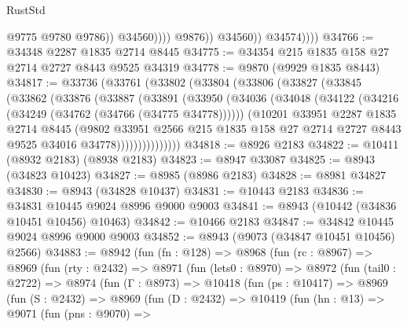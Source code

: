 \begin{lexlean}{RustStd}
\begin{coremodule}
{\begin{coremodule}
{{{{{{{{{{{{{{{{{{{{{{{{{{{{{{{{{{{{{{{                                @9775
                                @9780
                                @9786))
                            @34560))))
                    @9876))
                @34560))
            @34574))))
@34766 := @34348 @2287 @1835 @2714 @8445
@34775 := @34354 @215 @1835 @158 @27 @2714 @2727 @8443 @9525 @34319
@34778 := @9870 (@9929 @1835 @8443)
@34817 := @33736
    (@33761
      (@33802
        (@33804
          (@33806
            (@33827
              (@33845
                (@33862
                  (@33876
                    (@33887
                      (@33891
                        (@33950
                          (@34036
                            (@34048
                              (@34122 (@34216 (@34249 (@34762 (@34766 (@34775 @34778))))))
                              (@10201
                                @33951
                                @2287
                                @1835
                                @2714
                                @8445
                                (@9802
                                  @33951
                                  @2566
                                  @215
                                  @1835
                                  @158
                                  @27
                                  @2714
                                  @2727
                                  @8443
                                  @9525
                                  @34016
                                  @34778)))))))))))))))
@34818 := @8926 @2183
@34822 := @10411 (@8932 @2183) (@8938 @2183)
@34823 := @8947 @33087
@34825 := @8943 (@34823 @10423)
@34827 := @8985 (@8986 @2183)
@34828 := @8981 @34827
@34830 := @8943 (@34828 @10437)
@34831 := @10443 @2183
@34836 := @34831 @10445 @9024 @8996 @9000 @9003
@34841 := @8943 (@10442 (@34836 @10451 @10456) @10463)
@34842 := @10466 @2183
@34847 := @34842 @10445 @9024 @8996 @9000 @9003
@34852 := @8943 (@9073 (@34847 @10451 @10456) @2566)
@34883 := @8942
    (fun (fn : @128) =>
    @8968
      (fun (rc : @8967) =>
      @8969
        (fun (rty : @2432) =>
        @8971
          (fun (lets0 : @8970) =>
          @8972
            (fun (tail0 : @2722) =>
            @8974
              (fun (Γ : @8973) =>
              @10418
                (fun (ps : @10417) =>
                @8969
                  (fun (S : @2432) =>
                  @8969
                    (fun (D : @2432) =>
                    @10419
                      (fun (hn : @13) =>
                      @9071
                        (fun (pns : @9070) =>
}}}}}}}}}}}}}}}}}}}}}}}}}}}}}}}}}}}}}}}
\end{coremodule}}
\end{coremodule}
\end{lexlean}
